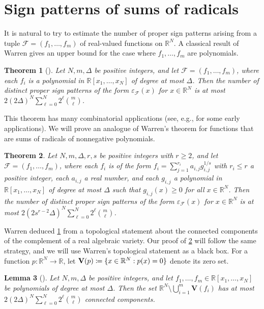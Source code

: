 \documentclass[11pt]{amsart}
\newtheorem{theorem}{Theorem}[section]
\newtheorem{lemma}[theorem]{Lemma}
\theoremstyle{definition}
\DeclarePairedDelimiter{\set}{\{}{\}}
\newcommand{\calf}{\mathcal{F}}
\newcommand{\eps}{\varepsilon}
\newcommand{\RR}{\mathbb{R}}
\newcommand{\VV}{\mathbf{V}}
\begin{document}
\section{Sign patterns of sums of radicals}\label{sec:sign_patterns}

It is natural to try to estimate the number of proper sign patterns arising from a tuple $\calf=(f_1, \ldots, f_m)$ of real-valued functions on $\RR^N$. A classical result of Warren gives an upper bound for the case where $f_1, \ldots, f_m$ are polynomials.

\begin{theorem}[{\cite[Theorem~3]{Warren1968}}]\label{thm:warren}
Let $N,m,\Delta$ be positive integers, and let $\calf=(f_1, \ldots, f_m)$, where each $f_i$ is a polynomial in $\RR[x_1,\ldots, x_N]$ of degree at most $\Delta$. Then the number of distinct proper sign patterns of the form $\eps_{\calf}(x)$ for $x\in\RR^N$ is at most
$2(2\Delta)^N\sum_{\ell=0}^N 2^\ell \binom{m}{\ell}$.
\end{theorem}

This theorem has many combinatorial applications (see, e.g., \cite{Alon1995} for some early applications).  We will prove an analogue of Warren's theorem for functions that are sums of radicals of nonnegative polynomials. 

\begin{theorem}\label{thm:sign-patterns-fractional}
Let $N,m,\Delta, r,s$ be positive integers with $r \geq 2$, and let $\calf=(f_1, \ldots, f_m)$, where each $f_i$ is of the form
$f_i=\sum_{j=1}^{r_i} a_{i,j} g_{i,j}^{1/s}$
with $r_i \leq r$ a positive integer, each $a_{i,j}$ a real number, and each $g_{i,j}$ a polynomial in $\RR[x_1, \ldots, x_N]$ of degree at most $\Delta$ such that $g_{i,j}(x) \geq 0$ for all $x \in \RR^N$. Then the number of distinct proper sign patterns of the form $\eps_{\calf}(x)$ for $x\in\RR^N$ is at most
$2(2s^{r-2}\Delta)^N\sum_{\ell=0}^N 2^\ell \binom{m}{\ell}$.
\end{theorem}

Warren deduced \cref{thm:warren} from a topological statement about the connected components of the complement of a real algebraic variety.  Our proof of \cref{thm:sign-patterns-fractional} will follow the same strategy, and we will use Warren's topological statement as a black box.  For a function $p\colon\RR^N \to \RR$, let $\VV(p)\coloneqq\set{x \in \RR^N: p(x)=0}$ denote its zero set.

\begin{lemma}[{\cite[Theorem~2]{Warren1968}}]\label{lem:warren}
Let $N,m,\Delta$ be positive integers, and let $f_1, \ldots, f_m \in \RR[x_1,\ldots, x_N]$ be polynomials of degree at most $\Delta$. Then the set $\RR^N \setminus \bigcup_{i=1}^m \VV(f_i)$ has at most 
$2(2\Delta)^N\sum_{\ell=0}^N 2^\ell \binom{m}{\ell}$
connected components.
\end{lemma}
\end{document}
